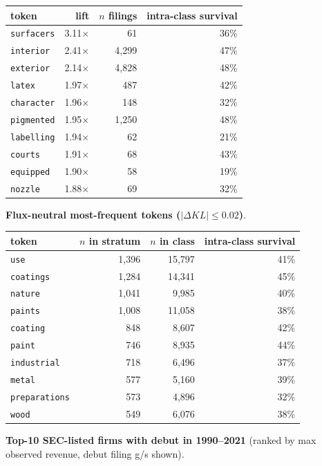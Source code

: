 \begin{tabular}{lrrr}
\toprule
token & lift & $n$ filings & intra-class survival \\
\midrule
\texttt{surfacers} & 3.11$\times$ & 61 & 36\% \\
\texttt{interior} & 2.41$\times$ & 4,299 & 47\% \\
\texttt{exterior} & 2.14$\times$ & 4,828 & 48\% \\
\texttt{latex} & 1.97$\times$ & 487 & 42\% \\
\texttt{character} & 1.96$\times$ & 148 & 32\% \\
\texttt{pigmented} & 1.95$\times$ & 1,250 & 48\% \\
\texttt{labelling} & 1.94$\times$ & 62 & 21\% \\
\texttt{courts} & 1.91$\times$ & 68 & 43\% \\
\texttt{equipped} & 1.90$\times$ & 58 & 19\% \\
\texttt{nozzle} & 1.88$\times$ & 69 & 32\% \\
\bottomrule
\end{tabular}

\textbf{Flux-neutral most-frequent tokens ($|\Delta KL|\leq 0.02$)}.

\begin{tabular}{lrrr}
\toprule
token & $n$ in stratum & $n$ in class & intra-class survival \\
\midrule
\texttt{use} & 1,396 & 15,797 & 41\% \\
\texttt{coatings} & 1,284 & 14,341 & 45\% \\
\texttt{nature} & 1,041 & 9,985 & 40\% \\
\texttt{paints} & 1,008 & 11,058 & 38\% \\
\texttt{coating} & 848 & 8,607 & 42\% \\
\texttt{paint} & 746 & 8,935 & 44\% \\
\texttt{industrial} & 718 & 6,496 & 37\% \\
\texttt{metal} & 577 & 5,160 & 39\% \\
\texttt{preparations} & 573 & 4,896 & 32\% \\
\texttt{wood} & 549 & 6,076 & 38\% \\
\bottomrule
\end{tabular}

\textbf{Top-10 SEC-listed firms with debut in 1990--2021} (ranked by max observed revenue, debut filing g/s shown).

